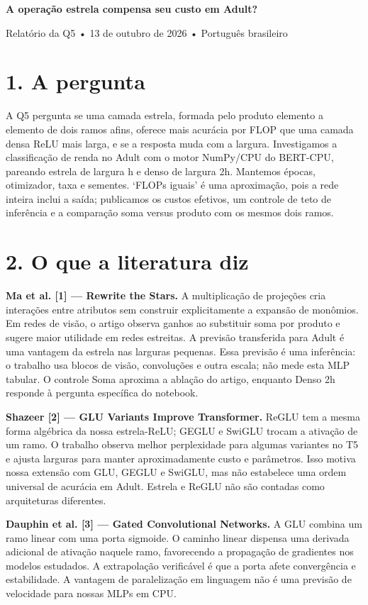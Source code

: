 \documentclass[10pt,a4paper]{article}
\begin{document}
{\Large\bfseries A operação estrela compensa seu custo em Adult?}\par
{\small Relatório da Q5 • 13 de outubro de 2026 • Português brasileiro}\par\medskip
\section*{1. A pergunta}
A Q5 pergunta se uma camada estrela, formada pelo produto elemento a elemento de dois ramos afins, oferece mais acurácia por FLOP que uma camada densa ReLU mais larga, e se a resposta muda com a largura. Investigamos a classificação de renda no Adult com o motor NumPy/CPU do BERT-CPU, pareando estrela de largura h e denso de largura 2h. Mantemos épocas, otimizador, taxa e sementes. ‘FLOPs iguais’ é uma aproximação, pois a rede inteira inclui a saída; publicamos os custos efetivos, um controle de teto de inferência e a comparação soma versus produto com os mesmos dois ramos.


\section*{2. O que a literatura diz}
\textbf{Ma et al. [1] — Rewrite the Stars.} A multiplicação de projeções cria interações entre atributos sem construir explicitamente a expansão de monômios. Em redes de visão, o artigo observa ganhos ao substituir soma por produto e sugere maior utilidade em redes estreitas. A previsão transferida para Adult é uma vantagem da estrela nas larguras pequenas. Essa previsão é uma inferência: o trabalho usa blocos de visão, convoluções e outra escala; não mede esta MLP tabular. O controle Soma aproxima a ablação do artigo, enquanto Denso 2h responde à pergunta específica do notebook.


\textbf{Shazeer [2] — GLU Variants Improve Transformer.} ReGLU tem a mesma forma algébrica da nossa estrela-ReLU; GEGLU e SwiGLU trocam a ativação de um ramo. O trabalho observa melhor perplexidade para algumas variantes no T5 e ajusta larguras para manter aproximadamente custo e parâmetros. Isso motiva nossa extensão com GLU, GEGLU e SwiGLU, mas não estabelece uma ordem universal de acurácia em Adult. Estrela e ReGLU não são contadas como arquiteturas diferentes.


\textbf{Dauphin et al. [3] — Gated Convolutional Networks.} A GLU combina um ramo linear com uma porta sigmoide. O caminho linear dispensa uma derivada adicional de ativação naquele ramo, favorecendo a propagação de gradientes nos modelos estudados. A extrapolação verificável é que a porta afete convergência e estabilidade. A vantagem de paralelização em linguagem não é uma previsão de velocidade para nossas MLPs em CPU.
\end{document}
